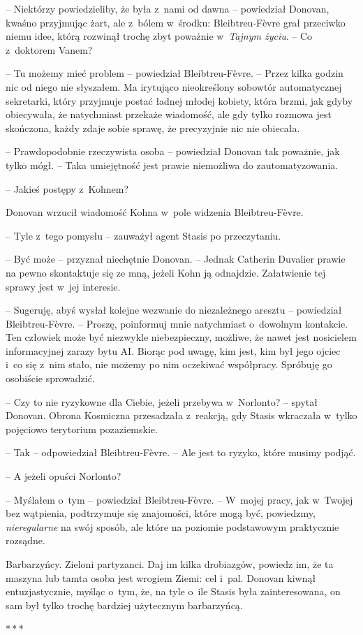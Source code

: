 \documentclass[oneside,polish,11pt,sfheadings]{mwbk}
\newcommand{\threeast}{\bigskip\par\centerline{*\,*\,*}\medskip\par}%
\begin{document}
-- Niektórzy powiedzieliby, że była z~nami od dawna -- powiedział Donovan,
kwaśno przyjmując żart, ale z~bólem w~środku: Bleibtreu-Fèvre grał
przeciwko niemu idee, którą rozwinął trochę zbyt poważnie w~\emph{Tajnym
życiu}. -- Co z~doktorem Vanem?

-- Tu możemy mieć problem -- powiedział Bleibtreu-Fèvre. -- Przez kilka
godzin nic od niego nie słyszałem. Ma irytująco nieokreślony sobowtór
automatycznej sekretarki, który przyjmuje postać ładnej młodej kobiety,
która brzmi, jak gdyby obiecywała, że natychmiast przekaże wiadomość,
ale gdy tylko rozmowa jest skończona, każdy zdaje sobie sprawę, że
precyzyjnie nic nie obiecała.

-- Prawdopodobnie rzeczywista osoba -- powiedział Donovan tak poważnie,
jak tylko mógł. -- Taka umiejętność jest prawie niemożliwa do
zautomatyzowania.

-- Jakieś postępy z~Kohnem?

Donovan wrzucił wiadomość Kohna w~pole widzenia Bleibtreu-Fèvre.

-- Tyle z~tego pomysłu -- zauważył agent Stasis po przeczytaniu.

-- Być może -- przyznał niechętnie Donovan. -- Jednak Catherin Duvalier
prawie na pewno skontaktuje się ze mną, jeżeli Kohn ją odnajdzie.
Załatwienie tej sprawy jest w~jej interesie.

-- Sugeruję, abyś wysłał kolejne wezwanie do niezależnego aresztu -- powiedział Bleibtreu-Fèvre. -- Proszę, poinformuj mnie natychmiast o~dowolnym kontakcie. Ten człowiek może być niezwykle niebezpieczny,
możliwe, że nawet jest nosicielem informacyjnej zarazy bytu AI. Biorąc
pod uwagę, kim jest, kim był jego ojciec i~co się z~nim stało, nie
możemy po nim oczekiwać współpracy. Spróbuję go osobiście sprowadzić.

-- Czy to nie ryzykowne dla Ciebie, jeżeli przebywa w~Norlonto? -- spytał
Donovan. Obrona Kosmiczna przesadzała z~reakcją, gdy Stasis wkraczała w~tylko pojęciowo terytorium pozaziemskie.

-- Tak -- odpowiedział Bleibtreu-Fèvre. -- Ale jest to ryzyko, które musimy
podjąć.

-- A jeżeli opuści Norlonto?

-- Myślałem o~tym -- powiedział Bleibtreu-Fèvre. -- W~mojej pracy, jak w~Twojej bez wątpienia, podtrzymuje się znajomości, które mogą być,
powiedzmy, \emph{nieregularne} na swój sposób, ale które na poziomie
podstawowym praktycznie rozsądne.

Barbarzyńcy. Zieloni partyzanci. Daj im kilka drobiazgów, powiedz im, że
ta maszyna lub tamta osoba jest wrogiem Ziemi: cel i~pal. Donovan kiwnął
entuzjastycznie, myśląc o~tym, że, na tyle o~ile Stasis była
zainteresowana, on sam był tylko trochę bardziej użytecznym barbarzyńcą.
  \threeast 
\end{document}
